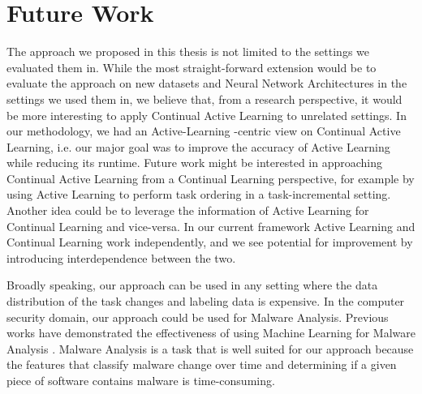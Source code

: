\section{Future Work}
\label{sec:Conclusion:FutureWork}
The approach we proposed in this thesis is not limited to the settings we evaluated them in. While the most straight-forward extension would
be to evaluate the approach on new datasets and Neural Network Architectures in the settings we used them in, we believe that, from a research
perspective, it would be more interesting to apply Continual Active Learning to unrelated settings. In our methodology, we had an Active-Learning
-centric view on Continual Active Learning, i.e. our major goal was to improve the accuracy of Active Learning while reducing its runtime. Future
work might be interested in approaching Continual Active Learning from a Continual Learning perspective, for example by using Active Learning to
perform task ordering in a task-incremental setting. Another idea could be to leverage the information of Active Learning for Continual Learning
and vice-versa. In our current framework Active Learning and Continual Learning work independently, and we see potential for improvement by 
introducing interdependence between the two. \par
Broadly speaking, our approach can be used in any setting where the data distribution of the task changes and labeling data is expensive.
In the computer security domain, our approach could be used for Malware Analysis. Previous works have demonstrated the effectiveness of using
Machine Learning for Malware Analysis \cite{nath2014static} \cite{ijaz2019static}. Malware Analysis is a task that is well suited for our approach
because the features that classify malware change over time and determining if a given piece of software contains malware is time-consuming. 